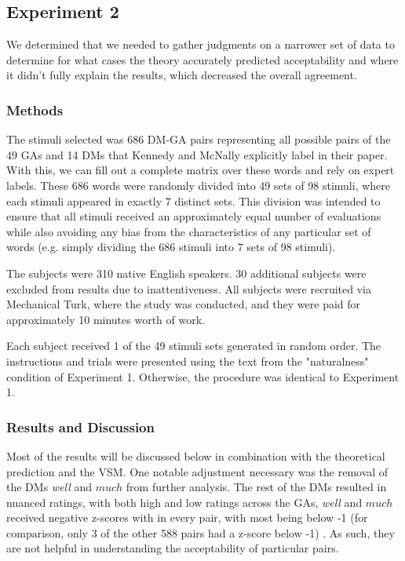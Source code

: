 \documentclass[11pt]{article}
\begin{document}
\subsection{Experiment 2}

We determined that we needed to gather judgments on a narrower set of data to determine for what cases the theory accurately predicted acceptability and where it didn't fully explain the results, which decreased the overall agreement.

\subsubsection{Methods}
The stimuli selected was 686 DM-GA pairs representing all possible pairs of the 49 GAs and 14 DMs that Kennedy and McNally explicitly label in their paper. With this, we can fill out a complete matrix over these words and rely on expert labels. These 686 words were randomly divided into 49 sets of 98 stimuli, where each stimuli appeared in exactly 7 distinct sets. This division was intended to ensure that all stimuli received an approximately equal number of evaluations while also avoiding any bias from the characteristics of any particular set of words (e.g. simply dividing the 686 stimuli into 7 sets of 98 stimuli).

The subjects were 310 native English speakers. 30 additional subjects were excluded from results due to inattentiveness. All subjects were recruited via Mechanical Turk, where the study was conducted, and they were paid for approximately 10 minutes worth of work.

Each subject received 1 of the 49 stimuli sets generated in random order. The instructions and trials were presented using the text from the "naturalness" condition of Experiment 1. Otherwise, the procedure was identical to Experiment 1.

\subsubsection{Results and Discussion}

Most of the results will be discussed below in combination with the theoretical prediction and the VSM. One notable adjustment necessary was the removal of the DMs \textit{well} and $much$ from further analysis. The rest of the DMs resulted in nuanced ratings, with both high and low ratings across the GAs, \textit{well} and $much$ received negative z-scores with in every pair, with most being below -1 (for comparison, only 3 of the other 588 pairs had a z-score below -1) . As such, they are not helpful in understanding the acceptability of particular pairs.
\end{document}
